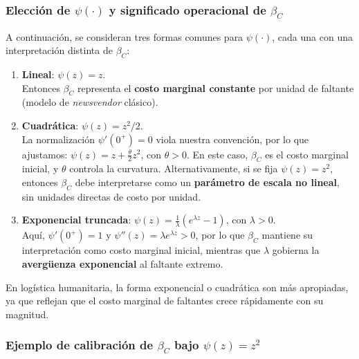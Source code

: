 \documentclass[
  spanish,
  us-letterpaper,
]{scrreprt}
\numberwithin{equation}{section}
\begin{document}
\subsubsection{\texorpdfstring{Elección de \(\psi(\cdot)\) y significado
operacional de
\(\beta_C\)}{Elección de \textbackslash psi(\textbackslash cdot) y significado operacional de \textbackslash beta\_C}}\label{elecciuxf3n-de-psicdot-y-significado-operacional-de-beta_c}

A continuación, se consideran tres formas comunes para \(\psi(\cdot)\),
cada una con una interpretación distinta de \(\beta_C\):

\begin{enumerate}
\def\labelenumi{\arabic{enumi}.}
\item
  \textbf{Lineal}: \(\psi(z) = z\).\\
  Entonces \(\beta_C\) representa el \textbf{costo marginal constante}
  por unidad de faltante (modelo de \emph{newsvendor} clásico).
\item
  \textbf{Cuadrática}: \(\psi(z) = z^2 / 2\).\\
  La normalización \(\psi'(0^+) = 0\) viola nuestra convención, por lo
  que ajustamos: \(\psi(z) = z + \frac{\theta}{2} z^2\), con
  \(\theta > 0\). En este caso, \(\beta_C\) es el costo marginal
  inicial, y \(\theta\) controla la curvatura. Alternativamente, si se
  fija \(\psi(z) = z^2\), entonces \(\beta_C\) debe interpretarse como
  un \textbf{parámetro de escala no lineal}, sin unidades directas de
  costo por unidad.
\item
  \textbf{Exponencial truncada}:
  \(\psi(z) = \frac{1}{\lambda}(e^{\lambda z} - 1)\), con
  \(\lambda > 0\).\\
  Aquí, \(\psi'(0^+) = 1\) y \(\psi''(z) = \lambda e^{\lambda z} > 0\),
  por lo que \(\beta_C\) mantiene su interpretación como costo marginal
  inicial, mientras que \(\lambda\) gobierna la \textbf{avergüenza
  exponencial} al faltante extremo.
\end{enumerate}

En logística humanitaria, la forma exponencial o cuadrática son más
apropiadas, ya que reflejan que el costo marginal de faltantes crece
rápidamente con su magnitud.

\subsubsection{\texorpdfstring{Ejemplo de calibración de \(\beta_C\)
bajo
\(\psi(z) = z^2\)}{Ejemplo de calibración de \textbackslash beta\_C bajo \textbackslash psi(z) = z\^{}2}}\label{ejemplo-de-calibraciuxf3n-de-beta_c-bajo-psiz-z2}
\end{document}
